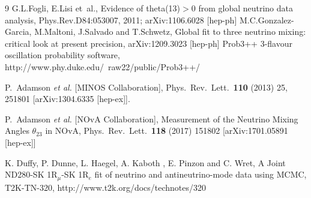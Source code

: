 \begin{thebibliography}{9}
% 
%
%
%
  G.L.Fogli, E.Lisi et~al.,
  Evidence of theta(13)$>$0 from global neutrino data analysis,
  Phys.Rev.D84:053007, 2011; arXiv:1106.6028 [hep-ph]
 M.C.Gonzalez-Garcia, M.Maltoni, J.Salvado and T.Schwetz,
 Global fit to three neutrino mixing: critical look at present precision,
 arXiv:1209.3023 [hep-ph]
%
%
%
%
 Prob3++ 3-flavour oscillation probability software,
 http://www.phy.duke.edu/~raw22/public/Prob3++/
 
  P.~Adamson {\it et al.}  [MINOS Collaboration],
  Phys.\ Rev.\ Lett.\  {\bf 110} (2013) 25,  251801
  [arXiv:1304.6335 [hep-ex]].

  P.~Adamson {\it et al.}  [NOvA Collaboration],
  Measurement of the Neutrino Mixing Angles $\theta_{23}$ in NOvA,
  Phys.\ Rev.\ Lett.\ {\bf 118} (2017) 151802
  [arXiv:1701.05891 [hep-ex]]

   K. Duffy, P. Dunne, L. Haegel, A. Kaboth , E. Pinzon and C. Wret,
   A Joint ND280-SK 1R$_\mu$-SK 1R$_e$ fit of neutrino and antineutrino-mode data using MCMC,
   T2K-TN-320,
   http://www.t2k.org/docs/technotes/320


\end{thebibliography}
